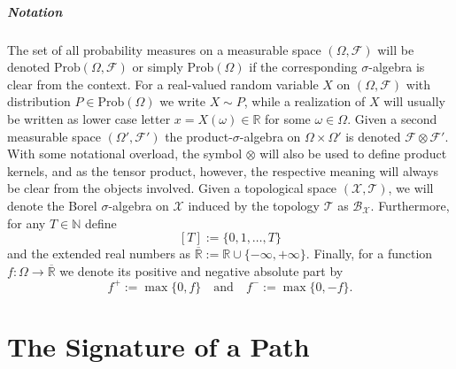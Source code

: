 \documentclass[
    a4paper,
    11pt,
    bibliography=totoc,
    listof=totoc,      
    headinclude=true,
    cleardoublepage=empty,
]{scrbook}
\theoremstyle{plain}
\theoremstyle{definition}
\theoremstyle{remark}
\newcommand{\SetR}{\mathbb R}
\newcommand{\SetN}{\mathbb N}
\begin{document}
\paragraph{Notation}
\label{chapter:Introduction:par:Notation}

The set of all probability measures on a measurable space $(\Omega, 
\mathcal{F})$ will be denoted $\text{Prob}(\Omega,\mathcal F)$ or simply 
$\text{Prob}(\Omega)$ if the corresponding $\sigma$-algebra is clear from the 
context. For a real-valued random variable $X$ on $(\Omega, \mathcal{F})$ with
distribution $P \in \text{Prob}(\Omega)$ we write $X \sim P$, while a 
realization of $X$ will usually be written as lower case letter $x = X(\omega) 
\in \SetR$ for some $\omega\in \Omega$. Given a second measurable space 
$(\Omega', \mathcal{F}')$ the product-$\sigma$-algebra on $\Omega\times\Omega'$ 
is denoted $\mathcal{F} \otimes\mathcal{F}'$. With some notational overload, 
the symbol $\otimes$ will also be used to define product kernels, and as the 
tensor product, however, the respective meaning will always be clear from the 
objects involved. 
%
Given a topological space $(\mathcal{X},
\mathcal{T})$, we will denote the Borel $\sigma$-algebra on $\mathcal{X}$ 
induced by the topology $\mathcal{T}$ as $\mathcal{B}_\mathcal{X}$.
%
Furthermore, for any $T\in\SetN$ define 
\[
    [T]:= \{0,1,\dots,T\}
\]
and the extended real numbers as $\overline{\SetR} := \SetR\cup\{-\infty, 
+\infty\}$. Finally, for a function $f:\Omega\to\overline{\SetR}$ we denote its positive and negative absolute part by
\[
    f^+:= \max\{0,f\} \quad \text{and} \quad f^-:= \max\{0,-f\}.
\]

\chapter{The Signature of a Path} 
\label{chapter:Signature}
\end{document}
